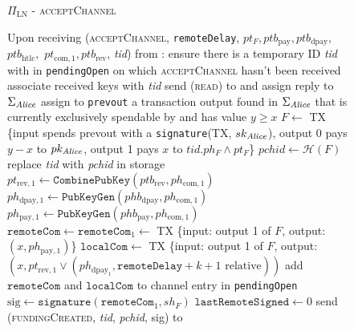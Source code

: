 \begin{figure}[!htbp]
  \begin{protocolbox}{$\Pi_{\mathrm{LN}}$ - \textsc{acceptChannel}}
    \begin{algorithmic}[1]
      \State Upon receiving (\textsc{acceptChannel}, \texttt{remoteDelay},
      $pt_F, ptb_{\mathrm{pay}}, ptb_{\mathrm{dpay}},$ $ptb_{\mathrm{htlc}},$
      $pt_{\mathrm{com}, 1}, ptb_{\mathrm{rev}}$, \textit{tid}) from \bob:
      \Indent
        \State ensure there is a temporary ID \textit{tid} with \bob{} in
        \texttt{pendingOpen} on which \textsc{acceptChannel} hasn't been
        received
        \State associate received keys with \textit{tid}
        \State send (\textsc{read}) to \ledger{} and assign reply to
        $\Sigma_{\mathit{Alice}}$
        \State assign to \texttt{prevout} a transaction output found in
        $\Sigma_{\mathit{Alice}}$ that is currently exclusively spendable by \alice{}
        and has value $y \geq x$
        \State $F \gets$ TX \{input spends prevout with a \texttt{signature}(TX,
        $sk_{\mathit{Alice}}$), output 0 pays $y - x$ to $pk_{\mathit{Alice}}$, output 1 pays
        $x$ to $\textit{tid}.ph_F \wedge pt_F$\}
        \State $\mathit{pchid} \gets \mathcal{H}\left(F\right)$
        \State replace \textit{tid} with \textit{pchid} in storage
        \State $pt_{\mathrm{rev}, 1} \gets
        \mathtt{CombinePubKey}\left(ptb_{\mathrm{rev}}, ph_{\mathrm{com},
        1}\right)$
        \State $ph_{\mathrm{dpay}, 1} \gets
        \texttt{PubKeyGen}\left(phb_{\mathrm{dpay}}, ph_{\mathrm{com},
        1}\right)$
        \State $ph_{\mathrm{pay}, 1} \gets
        \texttt{PubKeyGen}\left(phb_{\mathrm{pay}}, ph_{\mathrm{com}, 1}\right)$
        \State $\mathtt{remoteCom} \gets \mathtt{remoteCom}_1 \gets$ TX \{input:
        output 1 of $F$, output: $\left(x, ph_{\mathrm{pay}, 1}\right)$\}
        \State $\mathtt{localCom} \gets$ TX \{input: output 1 of $F$, output:
        $\left(x, pt_{\mathrm{rev}, 1} \vee \left(ph_{\mathrm{dpay}_1},
        \mathtt{remoteDelay} + k + 1 \text{ relative}\right)\right)$
        \State add $\mathtt{remoteCom}$ and $\mathtt{localCom}$ to channel entry
        in \texttt{pendingOpen}
        \State $\mathrm{sig} \gets \mathtt{signature}\left(\mathtt{remoteCom}_1,
        sh_F\right)$
        \State $\mathtt{lastRemoteSigned} \gets 0$
        \State send (\textsc{fundingCreated}, \textit{tid},
        \textit{pchid}, sig) to \bob{}
      \EndIndent
    \end{algorithmic}
  \end{protocolbox}
  \caption{}
  \label{alg:protocol:open:acceptChannel}
\end{figure}

